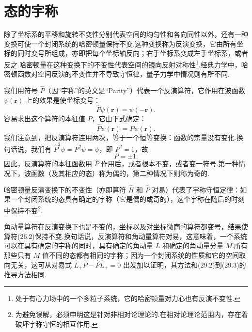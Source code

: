 \section{态的宇称}

除了坐标系的平移和旋转不变性分别代表空间的均匀性和各向同性以外，还有一种变换可使一个封闭系统的哈密顿量保持不变.这种变换称为反演变换，它由所有坐标的同时变号所组成，亦即把每个坐标轴反向；右手坐标系变成左手坐标系，或者反之.哈密顿量在这种变换下的不变性代表空间的镜向反射对称性\footnote{处于有心力场中的一个多粒子系统，它的哈密顿量对力心也有反演不变性.}.经典力学中，哈密顿函数对空间反演的不变性并不导致守恒律，量子力学中情况则有所不同.

我们用符号 $\hat{P}$（因“宇称”的英文是“Parity”）代表一个反演算符，它作用在波函数 $\psi(\boldsymbol{r})$ 上的效果是使坐标变号：
\begin{equation}
  \hat{P}\psi(\boldsymbol{r})=\psi(-\boldsymbol{r}).
\end{equation}
容易求出这个算符的本征值 $P$，它由下式确定：
\begin{equation}
  \hat{P}\psi(\boldsymbol{r})=P\psi(\boldsymbol{r}).
\end{equation}
我们注意到，把反演算符连用两次，等于一个恒等变换：函数的宗量没有变化.换句话说，我们有 $\hat{P}^2\psi=P^2\psi=\psi$，即 $P^2=1$，故
\begin{equation}
  P=\pm1.
\end{equation}
因此，反演算符的本征函数用 $\hat{P}$ 作用后，或者根本不变，或者变一符号.第一种情况下，波函数（及其相应的态）称为偶的，第二种情况下则称为奇的.

哈密顿量反演变换下的不变性（亦即算符 $\hat{H}$ 和 $\hat{P}$ 对易）代表了宇称守恒定律：如果一个封闭系统的态具有确定的宇称（它是偶的或奇的），这个宇称在随后的时刻中保持不变\footnote{为避免误解，必须申明这是针对非相对论理论的.在相对论理论范围内，存在着破坏宇称守恒的相互作用.}.

角动量算符在反演变换下也是不变的，坐标以及对坐标微商的算符都变号，结果使算符(26.2)保持不变.换句话说，反演算符和角动量算符对易，这意味着，一个系统可以在具有确定的宇称的同时，具有确定的角动量 $L$ 和确定的角动量分量 $M$.所有那些只有 $M$ 值不同的态都有相同的宇称；因为一个封闭系统的性质和它的空间取向无关，这可从对易式 $\hat{L}_+\hat{P}-\hat{P}\hat{L}_+=0$ 出发加以证明，其方法和(29.2)到(29.3)的推导方法相同.

